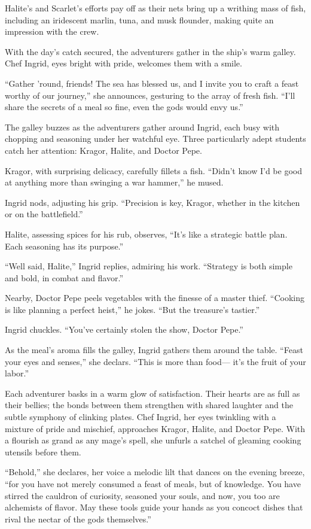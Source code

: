 \documentclass[
  letterpaper,12pt,twoside,twocolumn,openany,
  nodeprecatedcode,bg=full]{dndbook}
\begin{document}
Halite's and Scarlet's efforts pay off as their nets bring up a writhing
mass of fish, including an iridescent marlin, tuna, and musk flounder,
making quite an impression with the crew.

With the day's catch secured, the adventurers gather in the ship's warm
galley. Chef Ingrid, eyes bright with pride, welcomes them with a smile.

``Gather 'round, friends! The sea has blessed us, and I invite you to
craft a feast worthy of our journey,'' she announces, gesturing to the
array of fresh fish. ``I'll share the secrets of a meal so fine, even
the gods would envy us.''

The galley buzzes as the adventurers gather around Ingrid, each busy
with chopping and seasoning under her watchful eye. Three particularly
adept students catch her attention: Kragor, Halite, and Doctor Pepe.

Kragor, with surprising delicacy, carefully fillets a fish. ``Didn't
know I'd be good at anything more than swinging a war hammer,'' he
mused.

Ingrid nods, adjusting his grip. ``Precision is key, Kragor, whether in
the kitchen or on the battlefield.''

Halite, assessing spices for his rub, observes, ``It's like a strategic
battle plan. Each seasoning has its purpose.''

``Well said, Halite,'' Ingrid replies, admiring his work. ``Strategy is
both simple and bold, in combat and flavor.''

Nearby, Doctor Pepe peels vegetables with the finesse of a master thief.
``Cooking is like planning a perfect heist,'' he jokes. ``But the
treasure's tastier.''

Ingrid chuckles. ``You've certainly stolen the show, Doctor Pepe.''

As the meal's aroma fills the galley, Ingrid gathers them around the
table. ``Feast your eyes and senses,'' she declars. ``This is more than
food--- it's the fruit of your labor.''

Each adventurer basks in a warm glow of satisfaction. Their hearts are
as full as their bellies; the bonds between them strengthen with shared
laughter and the subtle symphony of clinking plates. Chef Ingrid, her
eyes twinkling with a mixture of pride and mischief, approaches Kragor,
Halite, and Doctor Pepe. With a flourish as grand as any mage's spell,
she unfurls a satchel of gleaming cooking utensils before them.

``Behold,'' she declares, her voice a melodic lilt that dances on the
evening breeze, ``for you have not merely consumed a feast of meals, but
of knowledge. You have stirred the cauldron of curiosity, seasoned your
souls, and now, you too are alchemists of flavor. May these tools guide
your hands as you concoct dishes that rival the nectar of the gods
themselves.''
\end{document}
